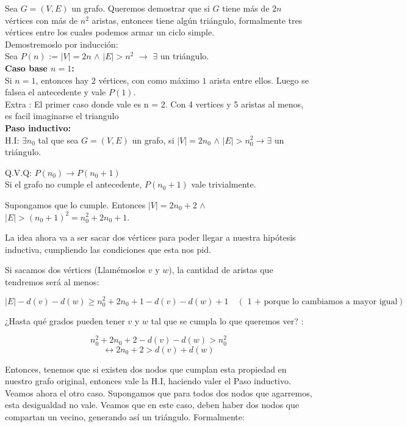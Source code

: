 \documentclass{article}
\begin{document}
Sea $G = (V,E)$ un grafo. Queremos demostrar que si $G$ tiene más de $2n$ vértices con más de $n^2$ aristas, entonces tiene algún triángulo, formalmente tres vértices entre los cuales podemos armar un ciclo simple.\\

Demostremoslo por inducción:\\

Sea $P(n)$ := $|V| = 2n$ $\land$ $|E| > n^2$ $\rightarrow$ $\exists$ un triángulo.\\

\textbf{Caso base $n = 1$:} \\

Si $n = 1$, entonces hay $2$ vértices, con como máximo $1$ arista entre ellos. Luego se falsea el antecedente y vale $P(1)$.\\

Extra : El primer caso donde vale es n = 2. Con 4 vertices y 5 aristas al menos, es facil imaginarse el triangulo\\
\textbf{Paso inductivo:}\\

H.I: $\exists n_0$ tal que sea $G = (V,E)$ un grafo, si $|V| = 2n_0$ $\land$ $|E| > n_0^2 \rightarrow \exists$ un triángulo.

Q.V.Q: $P(n_0) \rightarrow P(n_0 + 1)$ \\

Si el grafo no cumple el antecedente, $P(n_0 + 1)$ vale trivialmente.

Supongamos que lo cumple. Entonces $|V| = 2n_0 + 2$ $\land$ $|E| > (n_0 + 1)^2 = n_0^2 + 2n_0 + 1$.

La idea ahora va a ser sacar dos vértices para poder llegar a nuestra hipótesis inductiva, cumpliendo las condiciones que esta nos pid.

Si sacamos dos vértices (Llamémoslos $v$ y $w$), la cantidad de aristas que tendremos será al menos: 

\[
|E| - d(v) - d(w) \geq n_0^2 + 2n_0 + 1  - d(v) - d(w) + 1 \quad (\text{ 1 + porque lo cambiamos a mayor igual})
\]

¿Hasta qué grados pueden tener $v$ y $w$ tal que se cumpla lo que queremos ver? :

\[
n_0^2 + 2n_0 + 2 - d(v) - d(w) > n_0^2   
\]
\[
 \leftrightarrow  2n_0 + 2 > d(v) + d(w)
\]

Entonces, tenemos que si existen dos nodos que cumplan esta propiedad en nuestro grafo original, entonces vale la H.I, haciendo valer el Paso inductivo.
Veamos ahora el otro caso.
\newpage 
Supongamos que para todos dos nodos que agarremos, esta desigualdad no vale. Veamos que en este caso, deben haber dos nodos que compartan un vecino, generando así un triángulo. Formalmente:\\
\end{document}
